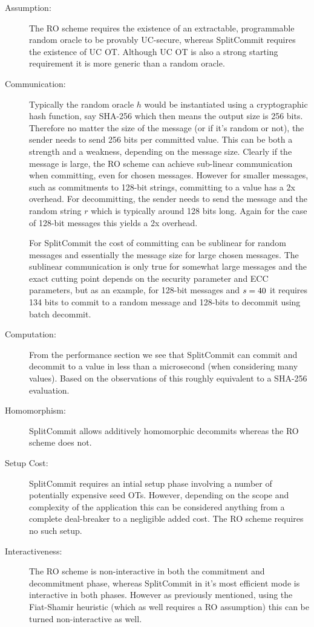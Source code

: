 \begin{description}
  \item[Assumption:] The RO scheme requires the existence of an extractable, programmable random oracle to be provably UC-secure, whereas SplitCommit requires the existence of UC OT. Although UC OT is also a strong starting requirement it is more generic than a random oracle.
  \item[Communication:] Typically the random oracle $h$ would be instantiated using a cryptographic hash function, say SHA-256 which then means the output size is 256 bits. Therefore no matter the size of the message (or if it's random or not), the sender needs to send 256 bits per committed value. This can be both a strength and a weakness, depending on the message size. Clearly if the message is large, the RO scheme can achieve sub-linear communication when committing, even for chosen messages. However for smaller messages, such as \eg commitments to 128-bit strings, committing to a value has a 2x overhead. For decommitting, the sender needs to send the message and the random string $r$ which is typically around 128 bits long. Again for the case of 128-bit messages this yields a 2x overhead.

  For SplitCommit the cost of committing can be sublinear for random messages and essentially the message size for large chosen messages. The sublinear communication is only true for somewhat large messages and the exact cutting point depends on the security parameter and ECC parameters, but as an example, for 128-bit messages and $s=40$ it requires 134 bits to commit to a random message and 128-bits to decommit using batch decommit.

  \item[Computation:] From the performance section we see that SplitCommit can commit and decommit to a value in less than a microsecond (when considering many values). Based on the observations of \cite{DBLP:conf/pkc/CascudoDDGNT15} this roughly equivalent to a SHA-256 evaluation.
  \item[Homomorphism:] SplitCommit allows additively homomorphic decommits whereas the RO scheme does not.
  \item[Setup Cost:] SplitCommit requires an intial setup phase involving a number of potentially expensive seed OTs. However, depending on the scope and complexity of the application this can be considered anything from a complete deal-breaker to a negligible added cost. The RO scheme requires no such setup.
  \item[Interactiveness:] The RO scheme is non-interactive in both the commitment and decommitment phase, whereas SplitCommit in it's most efficient mode is interactive in both phases. However as previously mentioned, using the Fiat-Shamir heuristic (which as well requires a RO assumption) this can be turned non-interactive as well.
\end{description}